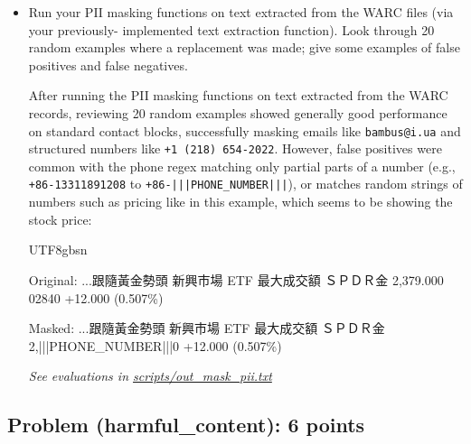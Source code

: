 \documentclass[letterpaper]{article}
\begin{document}
\begin{itemize}
	\item[(e)] Run your PII masking functions on text extracted from the WARC files (via your previously-
	implemented text extraction function). Look through 20 random examples where a replacement
	was made; give some examples of false positives and false negatives.

	After running the PII masking functions on text extracted from the WARC records, reviewing 20 random examples showed generally good performance on standard contact blocks, successfully masking emails like \verb|bambus@i.ua| and structured numbers like \verb|+1 (218) 654-2022|. However, false positives were common with the phone regex matching only partial parts of a number (e.g., \verb|+86-13311891208| to \texttt{+86-|||PHONE\_NUMBER|||}), or matches random strings of numbers such as pricing like in this example, which seems to be showing the stock price:

	\begin{CJK*}{UTF8}{gbsn}
		\begin{mdframed}
			\small\ttfamily
			\obeylines
			Original: ...跟隨黃金勢頭
			新興市場 ETF
			最大成交額
			ＳＰＤＲ金
			2,379.000
			02840
			+12.000 (0.507\%)

			Masked:   ...跟隨黃金勢頭
			新興市場 ETF
			最大成交額
			ＳＰＤＲ金
			2,|||PHONE\_NUMBER|||0
			+12.000 (0.507\%)
		\end{mdframed}
	\end{CJK*}

	\textit{See evaluations in  \href{https://github.com/echung32/ece405-assignment2-data/blob/main/scripts/out_mask_pii.txt}{scripts/out\_mask\_pii.txt}}

\end{itemize}

\subsection{Problem (harmful\_content): 6 points}
\end{document}
